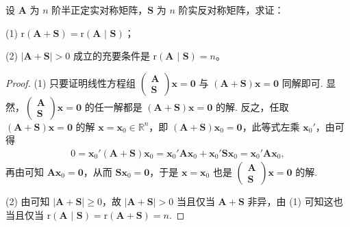 \documentclass[../../main.tex]{subfiles}%
\begin{document}
\begin{proposition}\label{proposition:半正定与实反称阵关于秩的性质}
设 $\boldsymbol{A}$ 为 $n$ 阶半正定实对称矩阵，$\boldsymbol{S}$ 为 $n$ 阶实反对称矩阵，求证：

(1) $\mathrm{r}\left( \boldsymbol{A}+\boldsymbol{S} \right) =\mathrm{r}\left( \boldsymbol{A}\,\,|\,\,\boldsymbol{S} \right) $；

(2) $|\boldsymbol{A}+\boldsymbol{S}|>0$ 成立的充要条件是 $\mathrm{r}\left( \boldsymbol{A}\,\,|\,\,\boldsymbol{S} \right)=n$。
\end{proposition}
\begin{proof}

(1) 只要证明线性方程组 $\begin{pmatrix}
\boldsymbol{A} \\
\boldsymbol{S}
\end{pmatrix}\boldsymbol{x}=\boldsymbol{0}$ 与 $(\boldsymbol{A}+\boldsymbol{S})\boldsymbol{x}=\boldsymbol{0}$ 同解即可. 显然，$\begin{pmatrix}
\boldsymbol{A} \\
\boldsymbol{S}
\end{pmatrix}\boldsymbol{x}=\boldsymbol{0}$ 的任一解都是 $(\boldsymbol{A}+\boldsymbol{S})\boldsymbol{x}=\boldsymbol{0}$ 的解. 反之，任取 $(\boldsymbol{A}+\boldsymbol{S})\boldsymbol{x}=\boldsymbol{0}$ 的解 $\boldsymbol{x}=\boldsymbol{x}_0\in\mathbb{R}^n$，即 $(\boldsymbol{A}+\boldsymbol{S})\boldsymbol{x}_0=\boldsymbol{0}$，此等式左乘 $\boldsymbol{x}_0'$，由可得
\begin{align*}
0=\boldsymbol{x}_0'(\boldsymbol{A}+\boldsymbol{S})\boldsymbol{x}_0=\boldsymbol{x}_0'\boldsymbol{A}\boldsymbol{x}_0+\boldsymbol{x}_0'\boldsymbol{S}\boldsymbol{x}_0=\boldsymbol{x}_0'\boldsymbol{A}\boldsymbol{x}_0,
\end{align*}
再由可知 $\boldsymbol{A}\boldsymbol{x}_0=\boldsymbol{0}$，从而 $\boldsymbol{S}\boldsymbol{x}_0=\boldsymbol{0}$，于是 $\boldsymbol{x}=\boldsymbol{x}_0$ 也是 $\begin{pmatrix}
\boldsymbol{A} \\
\boldsymbol{S}
\end{pmatrix}\boldsymbol{x}=\boldsymbol{0}$ 的解.

(2) 由可知 $|\boldsymbol{A}+\boldsymbol{S}|\geqslant 0$，故 $|\boldsymbol{A}+\boldsymbol{S}|>0$ 当且仅当 $\boldsymbol{A}+\boldsymbol{S}$ 非异，由 (1) 可知这也当且仅当 $\mathrm{r}\left( \boldsymbol{A}\,\,|\,\,\boldsymbol{S} \right) =\mathrm{r}(\boldsymbol{A}+\boldsymbol{S})=n$.

\end{proof}
\end{document}
